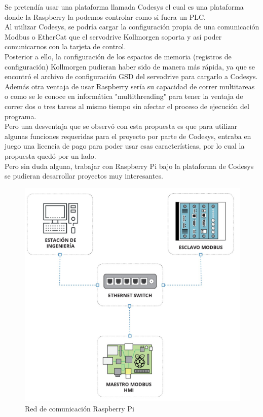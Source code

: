 \documentclass[12pt,titlepage]{article}
\begin{document}
Se pretendía usar una plataforma llamada Codesys el cual es una plataforma donde la Raspberry la podemos controlar como si fuera un PLC. \\ 

Al utilizar Codesys, se podría cargar la configuración propia de una comunicación Modbus o EtherCat que el servodrive Kollmorgen soporta y así poder comunicarnos con la tarjeta de control.\\ 

Posterior a ello, la configuración de los espacios de memoria (registros de configuración) Kollmorgen pudieran haber sido de manera más rápida, ya que se encontró el archivo de configuración GSD del servodrive para cargarlo a Codesys.\\

Además otra ventaja de usar Raspberry sería su capacidad de correr multitareas o como se le conoce en informática "multithreading" para tener la ventaja de correr dos o tres tareas al mismo tiempo sin afectar el proceso de ejecución del programa. \\ 

Pero una desventaja que se observó con esta propuesta es que para utilizar algunas funciones requeridas para el proyecto por parte de Codesys, entraba en juego una licencia de pago para poder usar esas características, por lo cual la propuesta quedó por un lado. \\

Pero sin duda alguna, trabajar con Raspberry Pi bajo la plataforma de Codesys se pudieran desarrollar proyectos muy interesantes. \\

\begin{figure}[htbp]
\hspace*{4.8cm} 
\includegraphics[scale=0.49]{bloq_diagram}
\caption{Red de comunicación Raspberry Pi}
\end{figure}
  
\end{document}
